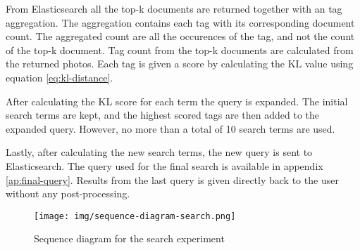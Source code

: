 From Elasticsearch all the top-k documents are returned together with an tag aggregation.
The aggregation contains each tag with its corresponding document count.
The aggregated count are all the occurences of the tag, and not the count of the top-k document.
Tag count from the top-k documents are calculated from the returned photos.
Each tag is given a score by calculating the KL value using equation \ref{eq:kl-distance}.

After calculating the KL score for each term the query is expanded.
The initial search terms are kept, and the highest scored tags are then added to the expanded query.
However, no more than a total of 10 search terms are used.

Lastly, after calculating the new search terms, the new query is sent to Elasticsearch.
The query used for the final search is available in appendix \ref{ap:final-query}.
Results from the last query is given directly back to the user without any post-processing.

\begin{figure}[h!]
\centering \texttt{[image: img/sequence-diagram-search.png]}
\caption{Sequence diagram for the search experiment}
\label{fig:sequence-diagram-search}
\end{figure}
